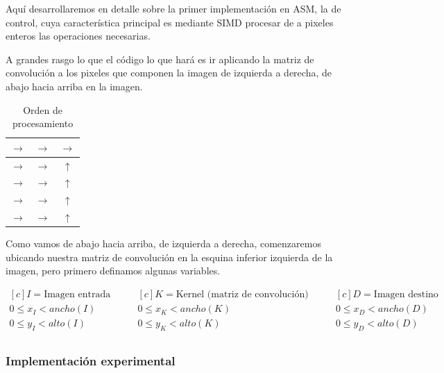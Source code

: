 Aquí desarrollaremos en detalle sobre la primer implementación en ASM, la de
control, cuya característica principal es mediante SIMD procesar de a pixeles
enteros las operaciones necesarias.

A grandes rasgo lo que el código lo que hará es ir aplicando la matriz de convolución a los pixeles que
componen la imagen de izquierda a derecha, de abajo hacia
arriba en la imagen.

\begin{table}[H]
	\centering
	\begin{tabular}{|ccc|}
		\hline
		$\longrightarrow$ & $\longrightarrow$ & $\longrightarrow$ \\ \hline
		$\longrightarrow$ & $\longrightarrow$ & $\uparrow$ \\ \hline
		$\longrightarrow$ & $\longrightarrow$ & $\uparrow$ \\ \hline
		$\longrightarrow$ & $\longrightarrow$ & $\uparrow$ \\ \hline
		$\longrightarrow$ & $\longrightarrow$ & $\uparrow$ \\ \hline
	\end{tabular}
	\caption{Orden de procesamiento}
\end{table}

Como vamos de abajo hacia arriba, de izquierda a derecha, comenzaremos ubicando
nuestra matriz de convolución en la esquina inferior izquierda de la imagen,
pero primero definamos algunas variables.

\begin{equation*}
	\begin{aligned}[c]
		I = \text{Imagen entrada} \\
		0 \leq x_I < ancho(I) \\
		0 \leq y_I < alto(I) \\
	\end{aligned}
	\qquad
	\begin{aligned}[c]
		K = \text{Kernel (matriz de convolución)} \\
		0 \leq x_K < ancho(K) \\
		0 \leq y_K < alto(K) \\
	\end{aligned}
	\qquad
	\begin{aligned}[c]
		D = \text{Imagen destino} \\
		0 \leq x_D < ancho(D) \\
		0 \leq y_D < alto(D) \\
	\end{aligned}
\end{equation*}

\subsubsection{Implementación experimental}

